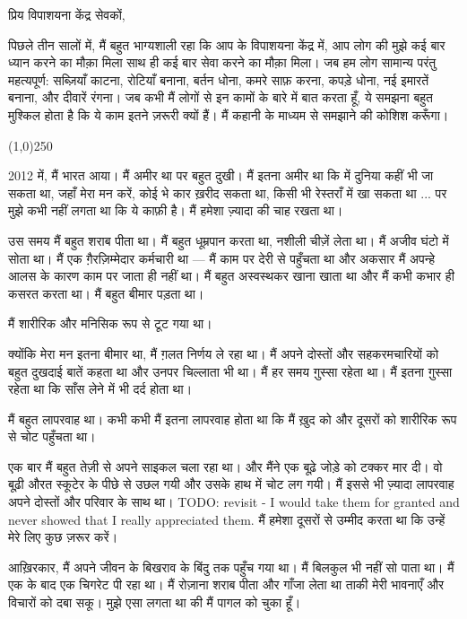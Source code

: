 \documentclass{article}
\begin{document}
प्रिय विपाशयना केंद्र सेवकों,

पिछले तीन सालों में, मैं बहुत भाग्यशाली रहा कि आप के विपाशयना केंद्र में, आप लोग की मुझे कई बार ध्यान करने का मौक़ा मिला साथ
ही कई बार सेवा करने का मौक़ा मिला। जब हम लोग सामान्य परंतु महत्यपूर्ण: सब्ज़ियाँ काटना, रोटियाँ
बनाना, बर्तन धोना, कमरे साफ़ करना, कपड़े धोना, नई इमारतें बनाना, और दीवारें रंगना। जब कभी मैं
लोगों से इन कामों के बारे में बात करता हूँ, ये समझना बहुत मुश्किल होता है कि ये काम इतने ज़रूरी क्यों हैं।
मैं कहानी के माध्यम से समझाने की कोशिश करूँगा।


\begin{center}
\line(1,0){250}
\end{center}

2012 में, मैं भारत आया। मैं अमीर था पर बहुत दुखी। मैं इतना अमीर था कि में दुनिया कहीं भी जा सकता
था, जहाँ मेरा मन करें, कोई भे कार ख़रीद सकता था, किसी भी रेस्तराँ में खा सकता था ... पर मुझे कभी
नहीं लगता था कि ये काफ़ी है। मैं हमेशा ज़्यादा की चाह रखता था।

उस समय मैं बहुत शराब पीता था। मैं बहुत धूम्रपान करता था, नशीली चीज़ें लेता था। मैं अजीव घंटो में सोता
था। मैं एक ग़ैरज़िम्मेदार कर्मचारी था --- मैं काम पर देरी से पहुँचता था और अकसार मैं अपन्हे आलस के कारण
काम पर जाता ही नहीं था। मैं बहुत अस्वस्थकर खाना खाता था और मैं कभी कभार ही कसरत करता था। मैं
बहुत बीमार पड़ता था।

मैं शारीरिक और मनिसिक रूप से टूट गया था।

क्योंकि मेरा मन इतना बीमार था, मैं ग़लत निर्णय ले रहा था। मैं अपने दोस्तों और सहकरमचारियों को बहुत
दुखदाई बातें कहता था और उनपर चिल्लाता भी था। मैं हर समय ग़ुस्सा रहेता था। मैं इतना ग़ुस्सा रहेता था
कि साँस लेने में भी दर्द होता था।

मैं बहुत लापरवाह था। कभी कभी मैं इतना लापरवाह होता था कि मैं ख़ुद को और दूसरों को शारीरिक रूप से
चोट पहुँचता था।

एक बार मैं बहुत तेज़ी से अपने साइकल चला रहा था। और मैंने एक बूढ़े जोड़े को टक्कर मार दी। वो बूढ़ी औरत
स्कूटेर के पीछे से उछल गयी और उसके हाथ में चोट लग गयी। मैं इससे भी ज़्यादा लापरवाह अपने दोस्तों और
परिवार के साथ था। TODO: revisit - I would take them for granted and never showed that I really
appreciated them. मैं हमेशा दूसरों से उम्मीद करता था कि उन्हें मेरे लिए कुछ ज़रूर करें।

आख़िरकार, मैं अपने जीवन के बिखराव के बिंदु तक पहुँच गया था। मैं बिलकुल भी नहीं सो पाता था। मैं एक के
बाद एक चिगरेट पी रहा था। मैं रोज़ाना शराब पीता और गाँजा लेता था ताकी मेरी भावनाएँ और विचारों
को दबा सकू। मुझे एसा लगता था की मैं पागल को चुका हूँ।
\end{document}

